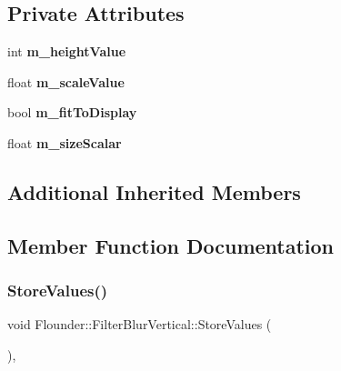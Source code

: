 \subsection*{Private Attributes}
\begin{DoxyCompactItemize}
\item 
\mbox{\label{class_flounder_1_1_filter_blur_vertical_a78ed0035973ecda99542e524a60e3f0b}} 
int {\bfseries m\+\_\+height\+Value}
\item 
\mbox{\label{class_flounder_1_1_filter_blur_vertical_ab2a435bf5d29092d63a992fa92d9aed2}} 
float {\bfseries m\+\_\+scale\+Value}
\item 
\mbox{\label{class_flounder_1_1_filter_blur_vertical_a4085b794a2d91bcc8d9e9cb077c45b7a}} 
bool {\bfseries m\+\_\+fit\+To\+Display}
\item 
\mbox{\label{class_flounder_1_1_filter_blur_vertical_abf8f19b3abcbadad4bcc82ba38893c02}} 
float {\bfseries m\+\_\+size\+Scalar}
\end{DoxyCompactItemize}
\subsection*{Additional Inherited Members}


\subsection{Member Function Documentation}
\mbox{\label{class_flounder_1_1_filter_blur_vertical_af3c9f462370e127b58636b8de79c341e}} 
\subsubsection{\texorpdfstring{Store\+Values()}{StoreValues()}}
{\footnotesize\ttfamily void Flounder\+::\+Filter\+Blur\+Vertical\+::\+Store\+Values (\begin{DoxyParamCaption}{ }\end{DoxyParamCaption})\hspace{0.3cm}{\ttfamily [override]}, {\ttfamily [virtual]}}



